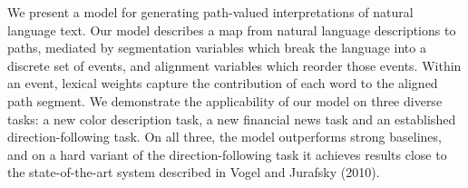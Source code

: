 We present a model for generating path-valued interpretations of natural language text. Our model describes a map from natural language descriptions to paths, mediated by segmentation variables which break the language into a discrete set of events, and alignment variables which reorder those events. Within an event, lexical weights capture the contribution of each word to the aligned path segment. We demonstrate the applicability of our model on three diverse tasks: a new color description task, a new financial news task and an established direction-following task. On all three, the model outperforms strong baselines, and on a hard variant of the direction-following task it achieves results close to the state-of-the-art system described in Vogel and Jurafsky (2010).
